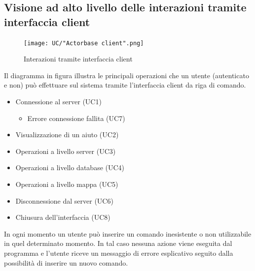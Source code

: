 \documentclass[a4paper]{article}
\begin{document}
		\subsection{Visione ad alto livello delle interazioni tramite interfaccia client}
		 	\begin{figure}[H]
				\centering
				\texttt{[image: UC/"Actorbase client".png]}
				\caption{Interazioni tramite interfaccia client}
			\end{figure}
			Il diagramma in figura illustra le principali operazioni che un utente (autenticato e non) può
			 effettuare sul sistema tramite l'interfaccia client da riga di comando. 
			\begin{itemize}
				\item Connessione al server (UC1)
				\begin{itemize}
					\item Errore connessione fallita (UC7)
				\end{itemize}
				\item Visualizzazione di un aiuto (UC2)
				\item Operazioni a livello server (UC3)
				\item Operazioni a livello database (UC4)
				\item Operazioni a livello mappa (UC5)
				\item Disconnessione dal server (UC6)
				\item Chiusura dell'interfaccia (UC8)
			\end{itemize}
	In ogni momento un utente può inserire un comando inesistente o non utilizzabile in quel determinato momento. In tal caso nessuna azione viene eseguita dal programma e l'utente riceve un messaggio di errore esplicativo seguito dalla possibilità di inserire un nuovo comando.	 
	 
	 
	 
\end{document}
